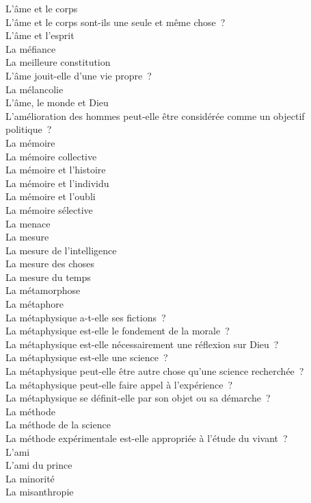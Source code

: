 \documentclass[a4paper,12pt]{article}
\begin{document}
L'âme et le corps \\
L'âme et le corps sont-ils une seule et même chose ? \\
L'âme et l'esprit \\
La méfiance \\
La meilleure constitution \\
L'âme jouit-elle d'une vie propre ? \\
La mélancolie \\
L'âme, le monde et Dieu \\
L'amélioration des hommes peut-elle être considérée comme un objectif politique ? \\
La mémoire \\
La mémoire collective \\
La mémoire et l'histoire \\
La mémoire et l'individu \\
La mémoire et l'oubli \\
La mémoire sélective \\
La menace \\
La mesure \\
La mesure de l'intelligence \\
La mesure des choses \\
La mesure du temps \\
La métamorphose \\
La métaphore \\
La métaphysique a-t-elle ses fictions ? \\
La métaphysique est-elle le fondement de la morale ? \\
La métaphysique est-elle nécessairement une réflexion sur Dieu ? \\
La métaphysique est-elle une science ? \\
La métaphysique peut-elle être autre chose qu'une science recherchée ? \\
La métaphysique peut-elle faire appel à l'expérience ? \\
La métaphysique se définit-elle par son objet ou sa démarche ? \\
La méthode \\
La méthode de la science \\
La méthode expérimentale est-elle appropriée à l'étude du vivant ? \\
L'ami \\
L'ami du prince \\
La minorité \\
La misanthropie \\
\end{document}
